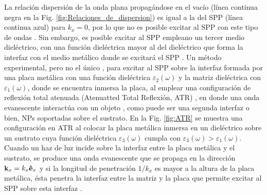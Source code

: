 La relación dispersión de la onda plana propagándose en el vacío (línea continua negra en la Fig. \ref{fig:Relaciones_de_dispersion})  es igual a la del SPP (línea continua azul) para  $k_x=0$, por lo que no es posible excitar al SPP con este tipo de ondas \cite{trugler2011properties}. Sin embargo, es posible excitar al SPP empleano un tercer medio dieléctrico, con una función dieléctrica mayor al del dieléctrico que forma la interfaz con el medio metálico donde se excitará el SPP \cite{trugler2011properties}. Un método experimental, pero no el único \cite{maier2007plasmonics}, para excitar al SPP sobre la interfaz formada por una placa metálica con una función dieléctrica $\varepsilon_2(\omega)$ y la matriz dieléctrica con $\varepsilon_1(\omega)$, donde se encuentra inmersa la placa, al emplear una configuración de reflexión total atenuada (Atenuatted Total Reflexión, ATR) \cite{kabashin2009plasmonic}, en donde una onda evanescente interactúa con un objeto \cite{hecht1998optics}, como puede ser una segunda interfaz o bien, NPs soportadas sobre el sustrato. En la Fig. \ref{fig:ATR} se muestra una configuración en ATR al colocar la placa metálica inmersa en un dieléctrico sobre un sustrato cuya función dieléctrica $\varepsilon_3(\omega)$ cumpla con $\varepsilon_3(\omega)>\varepsilon_1(\omega)$. Cuando un haz de luz incide sobre la interfaz entre la placa metálica y el sustrato, se produce una onda evanescente que se propaga en la dirección $\vb{k}_x=k_x\vu{e}_x$ y si la longitud de penetración $1/k_x$ es mayor a la altura de la placa metálica, ésta penetra la interfaz entre la matriz y la placa que permite excitar al SPP sobre esta interfaz \cite{trugler2011properties}. 	
	
